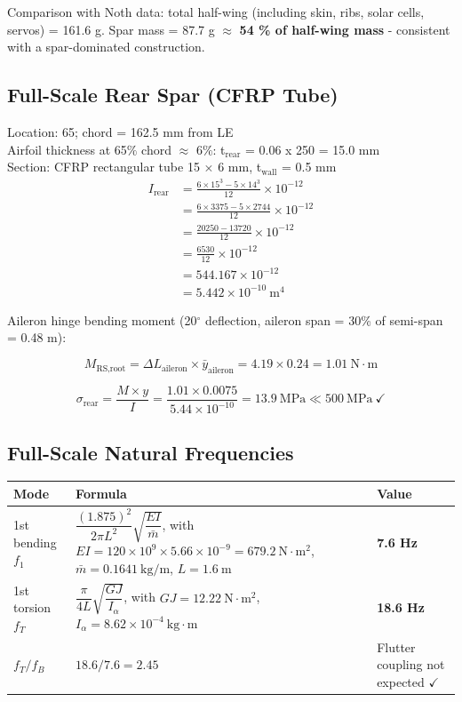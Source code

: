 \documentclass[10pt,a4paper]{article}
\begin{document}
Comparison with Noth data: total half-wing (including skin, ribs, solar cells, servos) = 161.6 g. Spar mass = 87.7 g ${\approx}$ \textbf{54 \% of half-wing mass} - consistent with a spar-dominated construction.


\subsection{Full-Scale Rear Spar (CFRP Tube)}

Location: 65; chord = 162.5 mm from LE\\
Airfoil thickness at 65\(\%\) chord \(\approx\) 6\(\%\): t\(_\text{rear}\) = 0.06 x 250 = 15.0 mm\\
Section: CFRP rectangular tube 15 \(\times\) 6 mm, t\(_\text{wall}\) = 0.5 mm\\
\begin{align*}
I_{\text{rear}} &= \frac{6 \times 15^{3} - 5 \times 14^{3}}{12} \times 10^{-12} \\
&= \frac{6 \times 3375 - 5 \times 2744}{12} \times 10^{-12} \\
&= \frac{20250 - 13720}{12} \times 10^{-12} \\
&= \frac{6530}{12} \times 10^{-12} \\
&= 544.167 \times 10^{-12} \\
&= 5.442 \times 10^{-10}\ \text{m}^4
\end{align*}

Aileron hinge bending moment (20$^{\circ}$ deflection, aileron span = 30\% of semi-span = 0.48 m):

\[
M_{\text{RS,root}} = \Delta L_{\text{aileron}} \times \bar{y}_{\text{aileron}} = 4.19 \times 0.24 = 1.01\ \text{N}\cdot\text{m}
\]

\[
\sigma_{\text{rear}} = \frac{M \times y}{I} = \frac{1.01 \times 0.0075}{5.44 \times 10^{-10}} = 13.9\ \text{MPa} \ll 500\ \text{MPa}\ \checkmark
\]


\subsection{Full-Scale Natural Frequencies}

\begin{center}
\renewcommand{\arraystretch}{1.3}
\begin{tabularx}{\textwidth}{|p{2.5cm}|X|p{3cm}|}
\hline
Mode & Formula & Value \\
\hline
1st bending $f_{1}$ & $\dfrac{(1.875)^2}{2\pi L^2}\sqrt{\dfrac{EI}{\bar{m}}}$, with $EI = 120\times10^{9} \times 5.66\times10^{-9} = 679.2\ \text{N}\cdot\text{m}^2$, $\bar{m} = 0.1641\ \text{kg/m}$, $L = 1.6\ \text{m}$ & \textbf{7.6 Hz} \\
\hline
1st torsion $f_T$ & $\dfrac{\pi}{4L}\sqrt{\dfrac{GJ}{I_\alpha}}$, with $GJ = 12.22\ \text{N}\cdot\text{m}^2$, $I_\alpha = 8.62\times10^{-4}\ \text{kg}\cdot\text{m}$ & \textbf{18.6 Hz} \\
\hline
$f_T / f_B$ & $18.6 / 7.6 = 2.45$ & Flutter coupling not expected $\checkmark$ \\
\hline
\end{tabularx}
\end{center}
\end{document}
